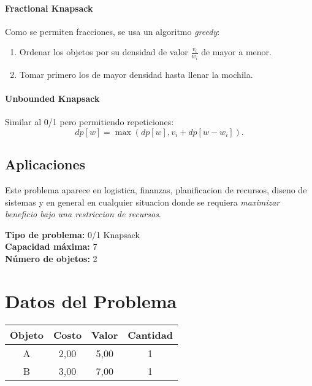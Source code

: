 \documentclass{article}
\begin{document}
\paragraph{Fractional Knapsack} Como se permiten fracciones, se usa un algoritmo \textit{greedy}:
\begin{enumerate}
  \item Ordenar los objetos por su densidad de valor $\frac{v_i}{w_i}$ de mayor a menor.
  \item Tomar primero los de mayor densidad hasta llenar la mochila.
\end{enumerate}

\paragraph{Unbounded Knapsack} Similar al 0/1 pero permitiendo repeticiones:
\[
dp[w] = \max ( dp[w], v_i + dp[w - w_i] ).
\]

\subsection{Aplicaciones}
Este problema aparece en logistica, finanzas, planificacion de recursos, diseno de sistemas y en general en cualquier situacion donde se requiera \textit{maximizar beneficio bajo una restriccion de recursos}.

\textbf{Tipo de problema:} 0/1 Knapsack\\
\textbf{Capacidad máxima:} 7\\
\textbf{Número de objetos:} 2\\

\clearpage
\section*{Datos del Problema}
\begin{tabular}{|c|c|c|c|}
\hline
Objeto & Costo & Valor & Cantidad \\
\hline
A & 2,00 & 5,00 & 1 \\
B & 3,00 & 7,00 & 1 \\
\hline
\end{tabular}
\end{document}
